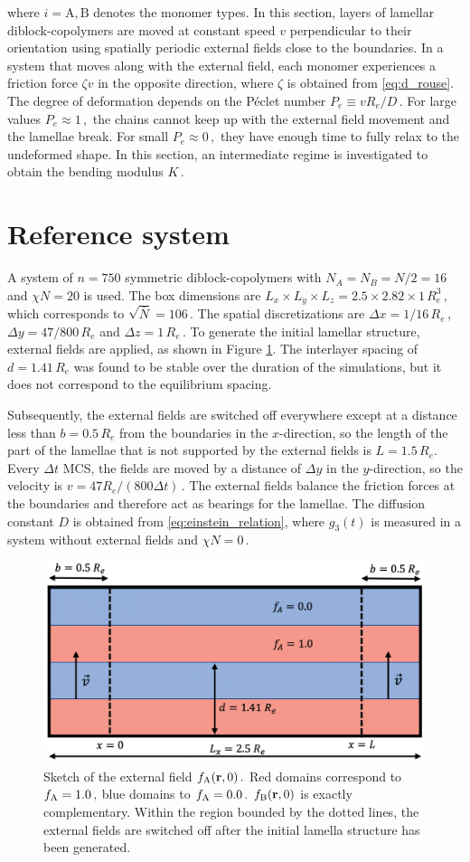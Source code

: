 \documentclass[bachelor,       %
               twoside,        %
               BCOR10mm,       %
               ngerman, english %
               ]{GAUBM}
\begin{document}
where $i=\mathrm A,\mathrm B$ denotes the monomer types. In this section, layers of lamellar diblock-copolymers are moved at constant speed $v$ perpendicular to their orientation using spatially periodic external fields close to the boundaries. In a system that moves along with the external field, each monomer experiences a friction force $\zeta v$ in the opposite direction, where $\zeta$ is obtained from \eqref{eq:d_rouse}. The degree of deformation depends on the P\'eclet number $P_e\equiv vR_e/D\,.$ For large values $P_e\approx 1\,,$ the chains cannot keep up with the external field movement and the lamellae break. For small $P_e\approx0\,,$ they have enough time to fully relax to the undeformed shape. In this section, an intermediate regime is investigated to obtain the bending modulus $K\,.$ 

\section{Reference system}
A system of $n=750$ symmetric diblock-copolymers with $N_A=N_B=N/2=16$ and $\chi N=20$ is used. The box dimensions are $L_x\times L_y\times L_z=2.5\times2.82\times1\,R_e^3\,,$ which corresponds to $\sqrt{\bar{N}}=106\,.$ The spatial discretizations are $\Delta x=1/16\,R_e\,,$ $\Delta y=47/800\,R_e$ and $\Delta z=1\,R_e\,.$ To generate the initial lamellar structure, external fields are applied, as shown in Figure \ref{fig:fext}. The interlayer spacing of $d=1.41\,R_e$ was found to be stable over the duration of the simulations, but it does not correspond to the equilibrium spacing.

Subsequently, the external fields are switched off everywhere except at a distance less than $b=0.5\,R_e$ from the boundaries in the $x$-direction, so the length of the part of the lamellae that is not supported by the external fields is $L=1.5\,R_e$. Every $\Delta t$ MCS, the fields are moved by a distance of $\Delta y$ in the $y$-direction, so the velocity is $v=47R_e/(800\Delta t)\,.$ The external fields balance the friction forces at the boundaries and therefore act as bearings for the lamellae. The diffusion constant $D$ is obtained from \eqref{eq:einstein_relation}, where $g_3(t)$ is measured in a system without external fields and $\chi N=0\,.$

\begin{figure}[h]
    \centering
    \includegraphics[width=0.6\linewidth]{figures/fext.png}
    \caption{Sketch of the external field $f_\text A(\mathbf r,0)\,.$ Red domains correspond to $f_\text A=1.0\,,$ blue domains to $f_\text A=0.0\,.$ $f_\text B(\mathbf r,0)$ is exactly complementary. Within the region bounded by the dotted lines, the external fields are switched off after the initial lamella structure has been generated.}
    \label{fig:fext}
\end{figure}
\end{document}

